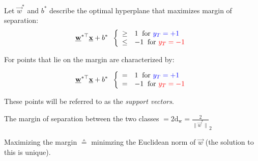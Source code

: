 \begin{frame}\frametitle{\subsecname}

Let $\vec w^{*}$ and $b^{*}$ describe the optimal hyperplane that maximizes margin of separation:
    \begin{equation}
    \vec w^{*\top} \vec x + b^{*} \;\;
    \left \{ \begin{array}{ll}
					\ge& 1 \;\;\text{for } {\color{blue}y_{T} = +1}\\
					\le& -1 \;\;\text{for } {\color{red}y_{T} = -1}
				\end{array} \right.  
    \end{equation}
    
    For points that lie on the margin are characterized by:
    
    \begin{equation}
    \vec w^{*\top} \vec x + b^{*} \;\;
    \left \{ \begin{array}{ll}
					=& 1 \;\;\text{for } {\color{blue}y_{T} = +1}\\
					=& -1 \;\;\text{for } {\color{red}y_{T} = -1}
				\end{array} \right.  
    \end{equation}
    
    These points will be referred to as the \emph{support vectors}.
    
    The margin of separation between the two classes $= 2 \mathrm{d_{w}} = \frac{2}{\lVert \vec w^{*}\rVert}_{2}$
    
    Maximizing the margin $\corresponds$ minimzing the Euclidean norm of $\vec w$ (the solution to this is unique).

\end{frame}

